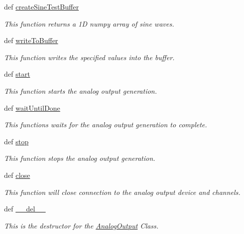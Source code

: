 \begin{DoxyCompactItemize}
def \hyperlink{class_chassis_8git_1_1_analog_output_1_1_analog_output_ace5d5f7391b706d3d9fc765f8400f54f}{create\-Sine\-Test\-Buffer}
\begin{DoxyCompactList}\small\item\em This function returns a 1\-D numpy array of sine waves. \end{DoxyCompactList}\item 
def \hyperlink{class_chassis_8git_1_1_analog_output_1_1_analog_output_a63ec98994d5077ff4f2829bd2b2ce0b9}{write\-To\-Buffer}
\begin{DoxyCompactList}\small\item\em This function writes the specified values into the buffer. \end{DoxyCompactList}\item 
def \hyperlink{class_chassis_8git_1_1_analog_output_1_1_analog_output_a677b68740e6aae3773cc29cb649affef}{start}
\begin{DoxyCompactList}\small\item\em This function starts the analog output generation. \end{DoxyCompactList}\item 
def \hyperlink{class_chassis_8git_1_1_analog_output_1_1_analog_output_ab7770a4b0c3eb18368a5b623435f9705}{wait\-Until\-Done}
\begin{DoxyCompactList}\small\item\em This functions waits for the analog output generation to complete. \end{DoxyCompactList}\item 
def \hyperlink{class_chassis_8git_1_1_analog_output_1_1_analog_output_a0925cf3df53bab026bc23547f8a072b0}{stop}
\begin{DoxyCompactList}\small\item\em This function stops the analog output generation. \end{DoxyCompactList}\item 
def \hyperlink{class_chassis_8git_1_1_analog_output_1_1_analog_output_a28ea1620eefeae3acd14f5b77a4b0b5d}{close}
\begin{DoxyCompactList}\small\item\em This function will close connection to the analog output device and channels. \end{DoxyCompactList}\item 
def \hyperlink{class_chassis_8git_1_1_analog_output_1_1_analog_output_a5107259ccff63da6c02ef6774b398b1b}{\-\_\-\-\_\-del\-\_\-\-\_\-}
\begin{DoxyCompactList}\small\item\em This is the destructor for the \hyperlink{class_chassis_8git_1_1_analog_output_1_1_analog_output}{Analog\-Output} Class. \end{DoxyCompactList}\end{DoxyCompactItemize}
